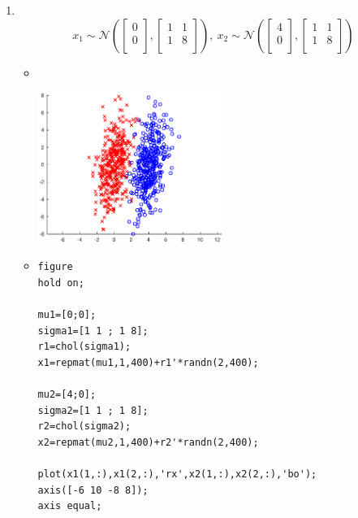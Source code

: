 \documentclass[letterpaper,11pt]{article}
\begin{document}
\begin{enumerate}
\item ~\\
\begin{equation}
\nonumber
x_1 \sim \mathcal{N} \left(\left[\begin{array}{c}
0 \\
0 \\
\end{array}\right], \left[\begin{array}{cc}
1 & 1 \\
1 & 8 \\
\end{array}\right] \right),~
x_2 \sim \mathcal{N} \left(\left[\begin{array}{c}
4 \\
0 \\
\end{array}\right], \left[\begin{array}{cc}
1 & 1 \\
1 & 8 \\
\end{array}\right]\right)
\end{equation}

\begin{itemize}
\item ~\\
\begin{center}
\includegraphics[width=0.5\textwidth]{./matlab/hw1_7_1.eps}
\end{center}
\item
\begin{verbatim}
figure
hold on;

mu1=[0;0];
sigma1=[1 1 ; 1 8];
r1=chol(sigma1);
x1=repmat(mu1,1,400)+r1'*randn(2,400);

mu2=[4;0];
sigma2=[1 1 ; 1 8];
r2=chol(sigma2);
x2=repmat(mu2,1,400)+r2'*randn(2,400);

plot(x1(1,:),x1(2,:),'rx',x2(1,:),x2(2,:),'bo');
axis([-6 10 -8 8]);
axis equal;


\end{verbatim}
\end{itemize}
\end{enumerate}
\end{document}
